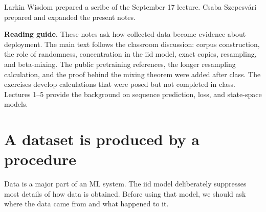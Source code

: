 \documentclass[11pt,twoside]{article}
\theoremstyle{definition}
\theoremstyle{remark}
\begin{document}
\begin{center}
\end{center}

\noindent Larkin Wisdom prepared a scribe of the September 17 lecture.
Csaba Szepesv\'ari prepared and expanded the present notes.

\medskip
\noindent\textbf{Reading guide.}
These notes ask how collected data become evidence about deployment. The main
text follows the classroom discussion: corpus construction, the role of
randomness, concentration in the iid model, exact copies, resampling, and
beta-mixing. The public pretraining references, the longer resampling
calculation, and the proof behind the mixing theorem were added after class.
The exercises develop calculations that were posed but not completed in class.
Lectures 1--5 provide the background on sequence prediction, loss, and
state-space models.

\section{A dataset is produced by a procedure}
\label{sec:pipeline}

Data is a major part of an ML system. The iid model deliberately suppresses
most details of how data is obtained. Before using that model, we should ask
where the data came from and what happened to it.
\end{document}
